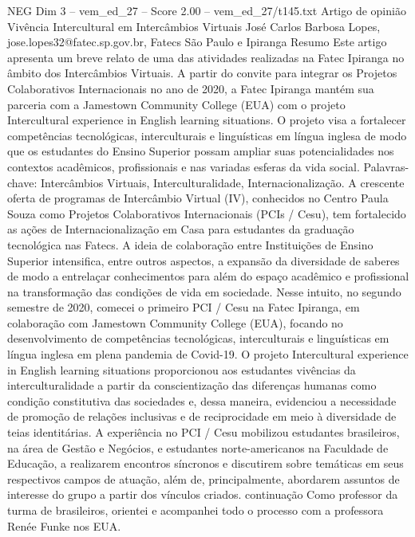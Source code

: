 \begin{textsample}{NEG Dim 3 – vem\_ed\_27 – Score 2.00 – vem\_ed\_27/t145.txt}  \label{ex:f3_neg_086}
Artigo de opinião Vivência Intercultural em Intercâmbios Virtuais José Carlos Barbosa Lopes, jose.lopes32@fatec.sp.gov.br, Fatecs São Paulo e Ipiranga Resumo Este artigo apresenta um breve relato de uma das atividades realizadas na Fatec Ipiranga no âmbito dos Intercâmbios Virtuais.
A partir do convite para integrar os Projetos Colaborativos Internacionais no ano de 2020, a Fatec Ipiranga mantém sua parceria com a Jamestown Community College (EUA) com o projeto Intercultural experience in English learning situations.
O projeto visa a fortalecer competências tecnológicas, interculturais e linguísticas em língua inglesa de modo que os estudantes do Ensino Superior possam ampliar suas potencialidades nos contextos acadêmicos, profissionais e nas variadas esferas da vida social.
Palavras-chave: Intercâmbios Virtuais, Interculturalidade, Internacionalização.
A crescente oferta de programas de Intercâmbio Virtual (IV), conhecidos no Centro Paula Souza como Projetos Colaborativos Internacionais (PCIs / Cesu), tem fortalecido as ações de Internacionalização em Casa para estudantes da graduação tecnológica nas Fatecs.
A ideia de colaboração entre Instituições de Ensino Superior intensifica, entre outros aspectos, a expansão da diversidade de saberes de modo a entrelaçar conhecimentos para além do espaço acadêmico e profissional na transformação das condições de vida em sociedade.
Nesse intuito, no segundo semestre de 2020, comecei o primeiro PCI / Cesu na Fatec Ipiranga, em colaboração com Jamestown Community College (EUA), focando no desenvolvimento de competências tecnológicas, interculturais e linguísticas em língua inglesa em plena pandemia de Covid-19.
O projeto Intercultural experience in English learning situations proporcionou aos estudantes vivências da interculturalidade a partir da conscientização das diferenças humanas como condição constitutiva das sociedades e, dessa maneira, evidenciou a necessidade de promoção de relações inclusivas e de reciprocidade em meio à diversidade de teias identitárias.
A experiência no PCI / Cesu mobilizou estudantes brasileiros, na área de Gestão e Negócios, e estudantes norte-americanos na Faculdade de Educação, a realizarem encontros síncronos e discutirem sobre temáticas em seus respectivos campos de atuação, além de, principalmente, abordarem assuntos de interesse do grupo a partir dos vínculos criados. continuação Como professor da turma de brasileiros, orientei e acompanhei todo o processo com a professora Renée Funke nos EUA.

\end{textsample}
